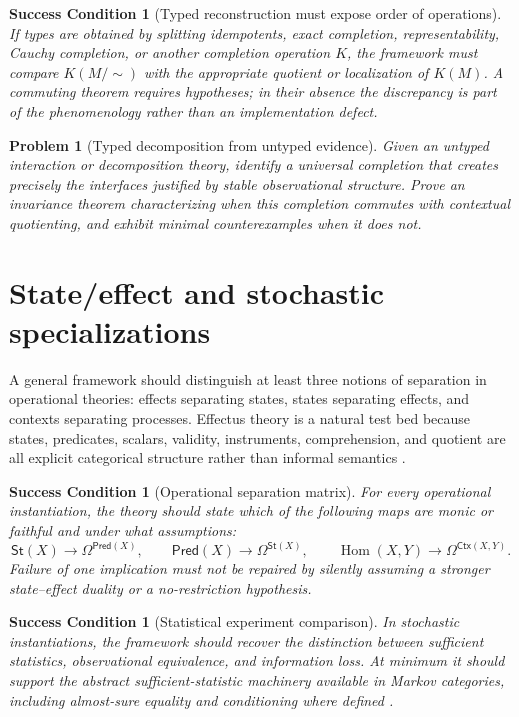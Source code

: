 \documentclass[11pt]{article}
\newtheorem{condition}[theorem]{Success Condition}
\newtheorem{problem}[theorem]{Problem}
\theoremstyle{definition}
\theoremstyle{remark}
\newcommand{\Ctx}{\mathsf{Ctx}}
\newcommand{\Pred}{\mathsf{Pred}}
\newcommand{\St}{\mathsf{St}}
\newcommand{\Hom}{\operatorname{Hom}}
\begin{document}
\begin{condition}[Typed reconstruction must expose order of operations]
If types are obtained by splitting idempotents, exact completion, representability, Cauchy completion, or another completion operation $K$, the framework must compare $K(M/{\sim})$ with the appropriate quotient or localization of $K(M)$. A commuting theorem requires hypotheses; in their absence the discrepancy is part of the phenomenology rather than an implementation defect.
\end{condition}

\begin{problem}[Typed decomposition from untyped evidence]
Given an untyped interaction or decomposition theory, identify a universal completion that creates precisely the interfaces justified by stable observational structure. Prove an invariance theorem characterizing when this completion commutes with contextual quotienting, and exhibit minimal counterexamples when it does not.
\end{problem}

\section{State/effect and stochastic specializations}

A general framework should distinguish at least three notions of separation in operational theories: effects separating states, states separating effects, and contexts separating processes. Effectus theory is a natural test bed because states, predicates, scalars, validity, instruments, comprehension, and quotient are all explicit categorical structure rather than informal semantics \cite{Effectus2015}.

\begin{condition}[Operational separation matrix]
For every operational instantiation, the theory should state which of the following maps are monic or faithful and under what assumptions:
\[
\St(X)\longrightarrow \Omega^{\Pred(X)},\qquad \Pred(X)\longrightarrow \Omega^{\St(X)},\qquad \Hom(X,Y)\longrightarrow \Omega^{\Ctx(X,Y)}.
\]
Failure of one implication must not be repaired by silently assuming a stronger state--effect duality or a no-restriction hypothesis.
\end{condition}

\begin{condition}[Statistical experiment comparison]
In stochastic instantiations, the framework should recover the distinction between sufficient statistics, observational equivalence, and information loss. At minimum it should support the abstract sufficient-statistic machinery available in Markov categories, including almost-sure equality and conditioning where defined \cite{Fritz2020}.
\end{condition}
\end{document}
